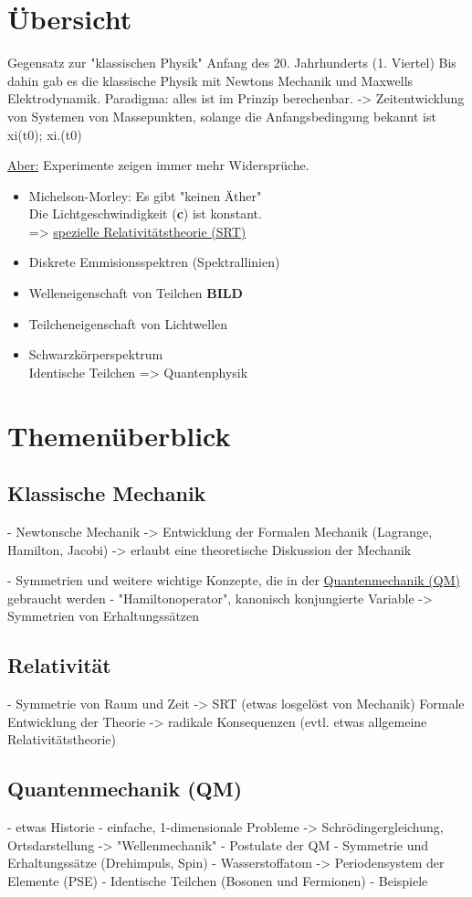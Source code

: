 \section{Übersicht}
Gegensatz zur "klassischen Physik"
Anfang des 20. Jahrhunderts (1. Viertel)
Bis dahin gab es die klassische Physik mit Newtons Mechanik und Maxwells Elektrodynamik.
Paradigma: alles ist im Prinzip berechenbar.
-> Zeitentwicklung von Systemen von Massepunkten, solange die Anfangsbedingung bekannt ist
xi(t0); xi.(t0)

\underline{Aber:} Experimente zeigen immer mehr Widersprüche.
\begin{itemize}
  \item Michelson-Morley: Es gibt "keinen Äther"\\
        Die Lichtgeschwindigkeit (\textbf{c}) ist konstant.\\
        => \underline{spezielle Relativitätstheorie (SRT)}
  \item Diskrete Emmisionsspektren (Spektrallinien)
  \item Welleneigenschaft von Teilchen \textbf{BILD}
  \item Teilcheneigenschaft von Lichtwellen
  \item Schwarzkörperspektrum\\
        Identische Teilchen
        => Quantenphysik
\end{itemize}

\section{Themenüberblick}
\subsection{Klassische Mechanik}
- Newtonsche Mechanik
-> Entwicklung der Formalen Mechanik (Lagrange, Hamilton, Jacobi)
-> erlaubt eine theoretische Diskussion der Mechanik

- Symmetrien und weitere wichtige Konzepte, die in der \underline{Quantenmechanik (QM)} gebraucht werden
- "Hamiltonoperator", kanonisch konjungierte Variable
-> Symmetrien von Erhaltungssätzen

\subsection{Relativität}
- Symmetrie von Raum und Zeit
-> SRT (etwas losgelöst von Mechanik)
Formale Entwicklung der Theorie
-> radikale Konsequenzen
(evtl. etwas allgemeine Relativitätstheorie)

\subsection{Quantenmechanik (QM)}
- etwas Historie
- einfache, 1-dimensionale Probleme
-> Schrödingergleichung, Ortsdarstellung
-> "Wellenmechanik"
- Postulate der QM
- Symmetrie und Erhaltungssätze (Drehimpuls, Spin)
- Wasserstoffatom
-> Periodensystem der Elemente (PSE)
- Identische Teilchen (Bosonen und Fermionen)
- Beispiele